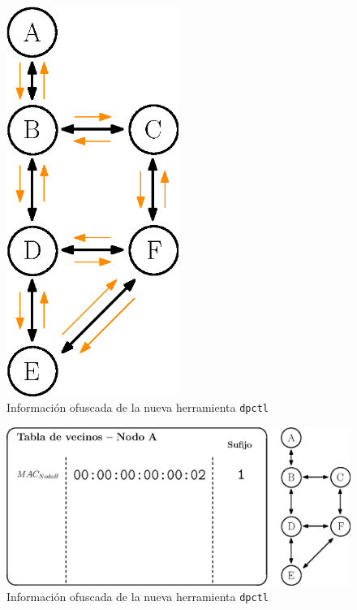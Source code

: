 \begin{figure}[ht]
    \centering
    \includegraphics[width=0.5\textwidth]{archivos/img/dev/topo_hellos.eps}
    \caption{Información ofuscada de la nueva herramienta \texttt{dpctl}}
    \label{fig:topo_hellos}
\end{figure}


\begin{figure}[ht!]
    \centering
    \includegraphics[width=\textwidth]{archivos/img/dev/topo_hello_nodoA_nb.eps}
    \caption{Información ofuscada de la nueva herramienta \texttt{dpctl}}
    \label{fig:topo_hello_nodoA_nb}
\end{figure}

